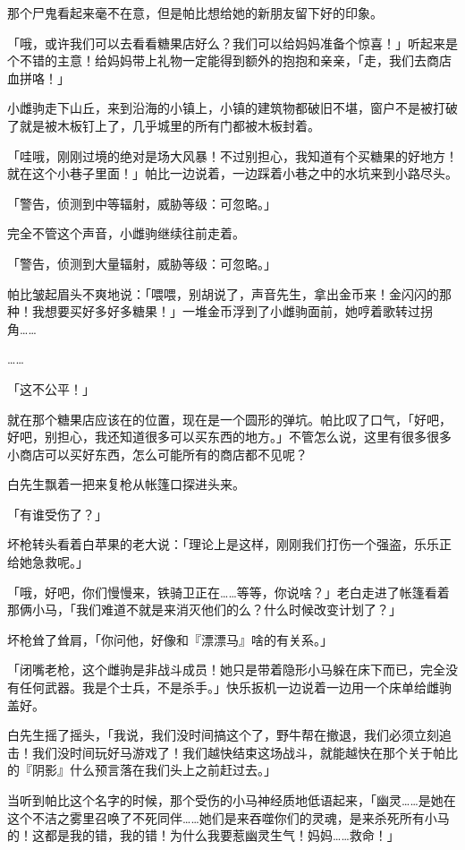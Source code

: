 那个尸鬼看起来毫不在意，但是帕比想给她的新朋友留下好的印象。

「哦，或许我们可以去看看糖果店好么？我们可以给妈妈准备个惊喜！」听起来是个不错的主意！给妈妈带上礼物一定能得到额外的抱抱和亲亲，「走，我们去商店血拼咯！」

小雌驹走下山丘，来到沿海的小镇上，小镇的建筑物都破旧不堪，窗户不是被打破了就是被木板钉上了，几乎城里的所有门都被木板封着。

「哇哦，刚刚过境的绝对是场大风暴！不过别担心，我知道有个买糖果的好地方！就在这个小巷子里面！」帕比一边说着，一边踩着小巷之中的水坑来到小路尽头。

「警告，侦测到中等辐射，威胁等级：可忽略。」

完全不管这个声音，小雌驹继续往前走着。

「警告，侦测到大量辐射，威胁等级：可忽略。」

帕比皱起眉头不爽地说：「喂喂，别胡说了，声音先生，拿出金币来！金闪闪的那种！我想要买好多好多糖果！」一堆金币浮到了小雌驹面前，她哼着歌转过拐角……{}

……{}

「这不公平！」

就在那个糖果店应该在的位置，现在是一个圆形的弹坑。帕比叹了口气，「好吧，好吧，别担心，我还知道很多可以买东西的地方。」不管怎么说，这里有很多很多小商店可以买好东西，怎么可能所有的商店都不见呢？

\horizonline


白先生飘着一把来复枪从帐篷口探进头来。

「有谁受伤了？」

坏枪转头看着白苹果的老大说：「理论上是这样，刚刚我们打伤一个强盗，乐乐正给她急救呢。」

「哦，好吧，你们慢慢来，铁骑卫正在……等等，你说啥？」老白走进了帐篷看着那俩小马，「我们难道不就是来消灭他们的么？什么时候改变计划了？」

坏枪耸了耸肩，「你问他，好像和『漂漂马』啥的有关系。」

「闭嘴老枪，这个雌驹是非战斗成员！她只是带着隐形小马躲在床下而已，完全没有任何武器。我是个士兵，不是杀手。」快乐扳机一边说着一边用一个床单给雌驹盖好。

白先生摇了摇头，「我说，我们没时间搞这个了，野牛帮在撤退，我们必须立刻追击！我们没时间玩好马游戏了！我们越快结束这场战斗，就能越快在那个关于帕比的『阴影』什么预言落在我们头上之前赶过去。」

当听到帕比这个名字的时候，那个受伤的小马神经质地低语起来，「幽灵……是她在这个不洁之雾里召唤了不死同伴……她们是来吞噬你们的灵魂，是来杀死所有小马的！这都是我的错，我的错！为什么我要惹幽灵生气！妈妈……救命！」

